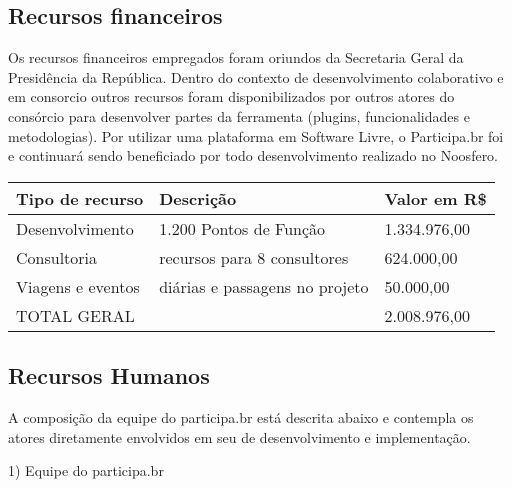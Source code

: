 \documentclass{article}
\begin{document}
\subsection{Recursos financeiros}

Os recursos financeiros empregados foram oriundos da Secretaria Geral da
Presidência da República. Dentro do contexto de desenvolvimento colaborativo e
em consorcio outros recursos foram disponibilizados por outros atores do
consórcio para desenvolver partes da ferramenta (plugins, funcionalidades e
metodologias). Por utilizar uma plataforma em Software Livre, o Participa.br
foi e continuará sendo beneficiado por todo desenvolvimento realizado no
Noosfero.

\begin{center}
    \begin{tabular}{ | l | l | l |}
    \hline
    Tipo de recurso   & Descrição & Valor em R\$ \\
    \hline
    Desenvolvimento   & 1.200 Pontos de Função         & 1.334.976,00 \\
    Consultoria       & recursos para 8 consultores    & 624.000,00   \\
    Viagens e eventos & diárias e passagens no projeto & 50.000,00    \\
    \hline
    TOTAL GERAL       &                                & 2.008.976,00 \\
    \hline
    \end{tabular}
\end{center}

\subsection{Recursos Humanos}

A composição da equipe do participa.br está descrita
abaixo e contempla os atores diretamente envolvidos em seu de desenvolvimento e
implementação.

1) Equipe do participa.br
\end{document}
